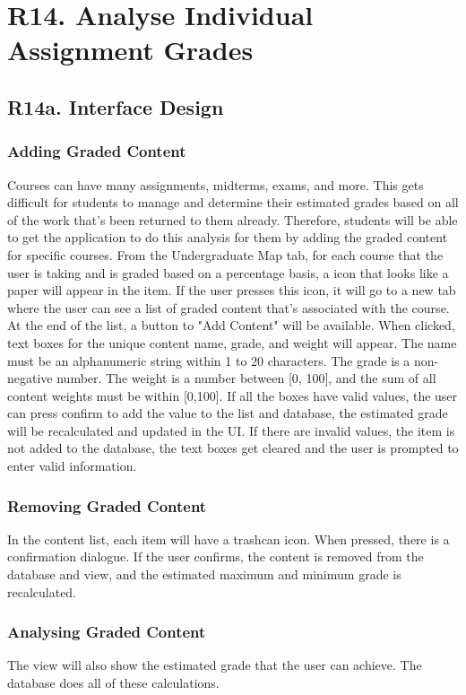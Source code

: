 \documentclass[12pt, a4paper]{article}
\begin{document}
\section*{R14. Analyse Individual Assignment Grades}
\label{sec:R14}
\subsection*{R14a. Interface Design}
\subsubsection*{Adding Graded Content}
Courses can have many assignments, midterms, exams, and more. This gets difficult for students to manage and determine their estimated grades based on all of the work that's been returned to them already. Therefore, students will be able to get the application to do this analysis for them by adding the graded content for specific courses. From the Undergraduate Map tab, for each course that the user is taking and is graded based on a percentage basis, a icon that looks like a paper will appear in the item. If the user presses this icon, it will go to a new tab where the user can see a list of graded content that's associated with the course. At the end of the list, a button to "Add Content" will be available. When clicked, text boxes for the unique content name, grade, and weight will appear. The name must be an alphanumeric string within 1 to 20 characters. The grade is a non-negative number. The weight is a number between [0, 100], and the sum of all content weights must be within [0,100]. If all the boxes have valid values, the user can press confirm to add the value to the list and database, the estimated grade will be recalculated and updated in the UI. If there are invalid values, the item is not added to the database, the text boxes get cleared and the user is prompted to enter valid information.
\subsubsection*{Removing Graded Content}
In the content list, each item will have a trashcan icon. When pressed, there is a confirmation dialogue. If the user confirms, the content is removed from the database and view, and the estimated maximum and minimum grade is recalculated.
\subsubsection*{Analysing Graded Content}
The view will also show the estimated grade that the user can achieve. The database does all of these calculations.
\end{document}
